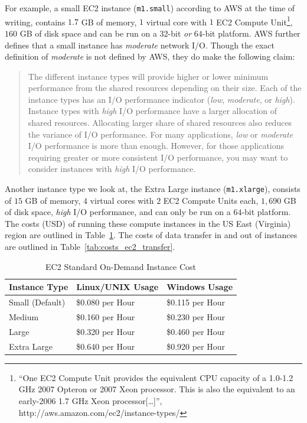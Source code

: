 For example, a small EC2 instance ({\tt m1.small}) according to
AWS\cite{amazonEC2InstanceTypes} at the time of writing, contains $1.7$ GB of
memory, $1$ virtual core with $1$ EC2 Compute Unit\footnote{``One EC2 Compute
  Unit provides the equivalent CPU capacity of a 1.0-1.2 GHz 2007 Opteron or
2007 Xeon processor. This is also the equivalent to an early-2006 1.7 GHz Xeon
processor[\ldots]'', http://aws.amazon.com/ec2/instance-types/}, $160$ GB of
disk space and can be run on a $32$-bit \emph{or} $64$-bit platform. AWS
further defines that a small instance has \emph{moderate} network I/O. Though
the exact definition of \emph{moderate} is not defined by AWS, they do make the
following claim\cite{amazonEC2InstanceTypes}:

\begin{quote}
  The different instance types will provide higher or lower minimum performance
  from the shared resources depending on their size. Each of the instance types
  has an I/O performance indicator (\emph{low}, \emph{moderate}, or
  \emph{high}). Instance types with \emph{high} I/O performance have a larger
  allocation of shared resources.  Allocating larger share of shared resources
  also reduces the variance of I/O performance. For many applications,
  \emph{low} or \emph{moderate} I/O performance is more than enough. However,
  for those applications requiring greater or more consistent I/O performance,
  you may want to consider instances with \emph{high} I/O performance.
\end{quote}

Another instance type we look at, the Extra Large instance ({\tt m1.xlarge}),
consists of $15$ GB of memory, $4$ virtual cores with $2$ EC2 Compute Units
each, $1,690$ GB of disk space, \emph{high} I/O performance, and can only be
run on a $64$-bit platform. The costs (USD) of running these compute instances
in the US East (Virginia) region are outlined in
Table~\ref{tab:costs_ec2_instance}. The costs of data transfer in and out of
instances are outlined in Table~\ref{tab:costs_ec2_transfer}.

\begin{table}[htp]
  \begin{center}
    \begin{tabular}{|l|l l|}
      \hline
      \multicolumn{1}{|c}{\textbf{Instance Type}} &
      \multicolumn{1}{|c}{\textbf{Linux/UNIX Usage}} & 
      \multicolumn{1}{c|}{\textbf{Windows Usage}}\\
      \hline
          Small (Default) & \$0.080 per Hour & \$0.115 per Hour\\
                   Medium & \$0.160 per Hour & \$0.230 per Hour\\
                    Large & \$0.320 per Hour & \$0.460 per Hour\\
              Extra Large & \$0.640 per Hour & \$0.920 per Hour\\
      \hline
    \end{tabular}
    \caption{EC2 Standard On-Demand Instance Cost}
    \label{tab:costs_ec2_instance}
  \end{center}
\end{table}

